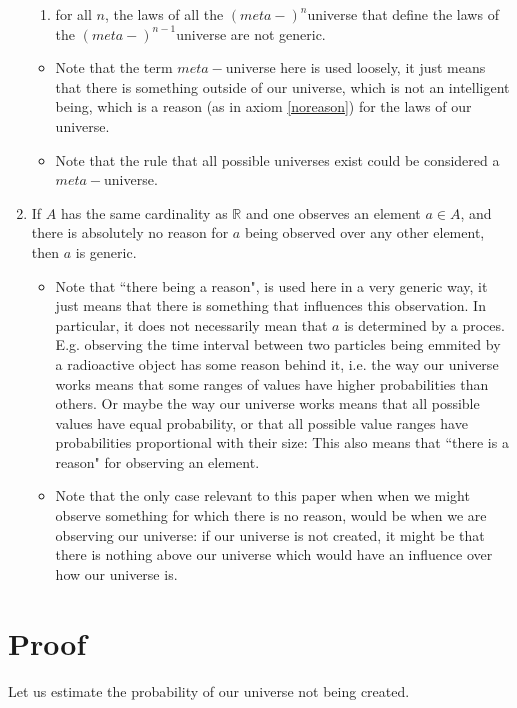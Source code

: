 \documentclass[a4paper
,draft
]{article}
\def\reale{\mathbb{R}}
\newcommand{\ghilimele}[1]{``#1"}
\begin{document}
\begin{enumerate}
\begin{enumerate}
    \item for all $n$, the laws of all the $(meta-)^n$universe that define the laws of the $(meta-)^{n-1}$universe are not generic.
  \end{enumerate}
  \begin{itemize}
    \item Note that the term $meta-$universe here is used loosely, it just means that there is something outside of our universe, which is not an intelligent being, which is a reason (as in axiom \ref{noreason}) for the laws of our universe.
    \item Note that the rule that all possible universes exist could be considered a $meta-$universe.
  \end{itemize}
\item \label{noreason} If $A$ has the same cardinality as $\reale$ and one observes an element $a\in A$, and there is absolutely no reason for $a$ being observed over any other element, then $a$ is generic.
  \begin{itemize}
    \item Note that \ghilimele{there being a reason}, is used here in a very generic way, it just means that there is something that influences this observation. In particular, it does not necessarily mean that $a$ is determined by a proces. E.g. observing the time interval between two particles being emmited by a radioactive object has some reason behind it, i.e. the way our universe works means that some ranges of values have higher probabilities than others. Or maybe the way our universe works means that all possible values have equal probability, or that all possible value ranges have probabilities proportional with their size: This also means that \ghilimele{there is a reason} for observing an element.
    \item Note that the only case relevant to this paper when when we might observe something for which there is no reason, would be when we are observing our universe: if our universe is not created, it might be that there is nothing above our universe which would have an influence over how our universe is.
  \end{itemize}
\end {enumerate}

\section{Proof}

Let us estimate the probability of our universe not being created.
\end{document}
